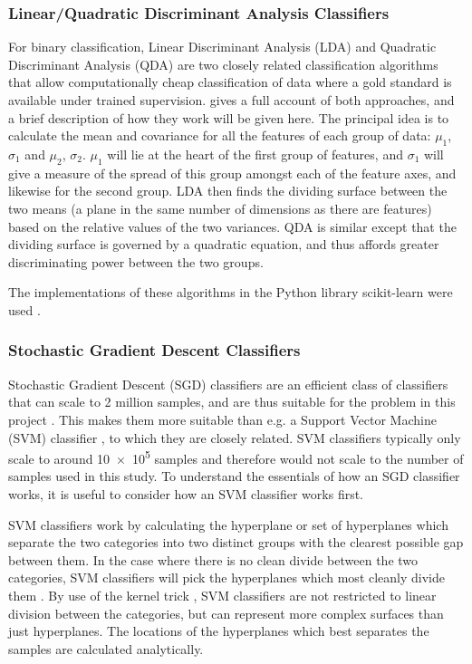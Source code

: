 \documentclass[pdftex,12pt,a4paper]{report}
\begin{document}
\subsubsection{Linear/Quadratic Discriminant Analysis Classifiers}

For binary classification, Linear Discriminant Analysis (LDA) and Quadratic Discriminant Analysis
(QDA) are two closely related classification algorithms that allow computationally cheap
classification of data where a gold standard is available under trained supervision.
\textcite{mclachlan2004discriminant} gives a full account of both approaches, and a brief description of how they
work will be given here. The principal idea is to calculate the mean and covariance for all the
features of each group of data: $\mu_1$, $\sigma_1$ and $\mu_2$, $\sigma_2$. $\mu_1$ will lie at the
heart of the first group of features, and $\sigma_1$ will give a measure of the spread of this group
amongst each of the feature axes, and likewise for the second group. LDA then finds the dividing
surface between the two means (a plane in the same number of dimensions as there are features) based
on the relative values of the two variances. QDA is similar except that the dividing surface is
governed by a quadratic equation, and thus affords greater discriminating power between the two
groups.

The implementations of these algorithms in the Python library scikit-learn were used
\parencite{scikitLearn2011}.

\subsubsection{Stochastic Gradient Descent Classifiers}
Stochastic Gradient Descent (SGD) classifiers are an efficient class of classifiers that can scale
to 2 million samples, and are thus suitable for the problem in this project
\parencite{singer07pegasos, bottou2008tradeoffs}. This makes them more suitable than e.g. a Support
Vector Machine (SVM) classifier \parencite{cortes1995support}, to which they are closely related.
SVM classifiers typically only scale to around \SI{10e5}{} samples and therefore would not scale to
the number of samples used in this study. To understand the essentials of how an SGD classifier
works, it is useful to consider how an SVM classifier works first.

SVM classifiers work by calculating the hyperplane or set of hyperplanes which separate the two
categories into two distinct groups with the clearest possible gap between them. In the case where
there is no clean divide between the two categories, SVM classifiers will pick the hyperplanes which
most cleanly divide them \parencite{cortes1995support}. By use of the kernel trick
\parencite{aizerman1964theoretical}, SVM classifiers are not restricted to linear division between
the categories, but can represent more complex surfaces than just hyperplanes. The locations of the
hyperplanes which best separates the samples are calculated analytically.
\end{document}
